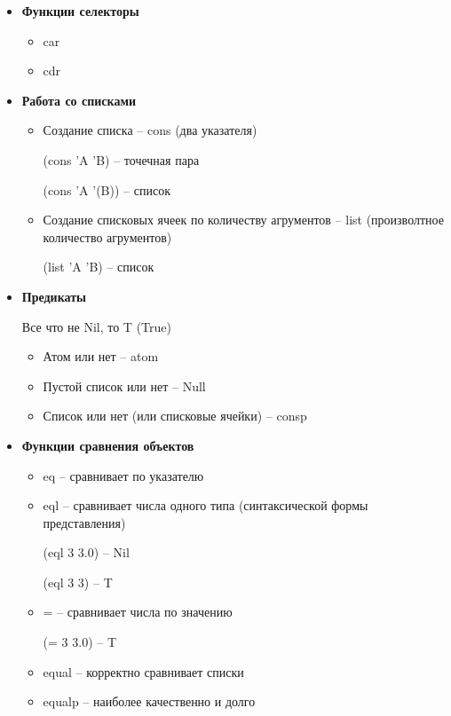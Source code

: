 \begin{itemize}
    \item \textbf{Функции селекторы}

        \begin{itemize}
            \item {\ttfamily car}
            \item {\ttfamily cdr}
        \end{itemize}

    \item \textbf{Работа со списками}

        \begin{itemize}
            \item Создание списка --
                {\ttfamily cons} (два указателя)

                {\ttfamily (cons 'A 'B)} -- точечная пара

                {\ttfamily (cons 'A '(B))} -- список

            \item Создание списковых ячеек по количеству агрументов --
                {\ttfamily list} (произволтное количество агрументов)

                {\ttfamily (list 'A 'B)} -- список
        \end{itemize}

    \item \textbf{Предикаты}

        Все что не {\ttfamily Nil}, то {\ttfamily T (True)}

        \begin{itemize}
            \item Атом или нет -- {\ttfamily atom}
            \item Пустой список или нет -- {\ttfamily Null}
            \item Список или нет (или списковые ячейки) --
                {\ttfamily consp}
        \end{itemize}

    \item \textbf{Функции сравнения объектов}

        \begin{itemize}
            \item {\ttfamily eq} -- сравнивает по указателю
            \item {\ttfamily eql} -- сравнивает числа одного типа
                (синтаксической формы представления)

                {\ttfamily (eql 3 3.0) -- Nil}

                {\ttfamily (eql 3 3) -- T}

            \item {\ttfamily =} -- сравнивает числа по значению

                {\ttfamily (= 3 3.0) -- T}

            \item {\ttfamily equal} -- корректно сравнивает списки
            \item {\ttfamily equalp} -- наиболее качественно и долго
        \end{itemize}
\end{itemize}

